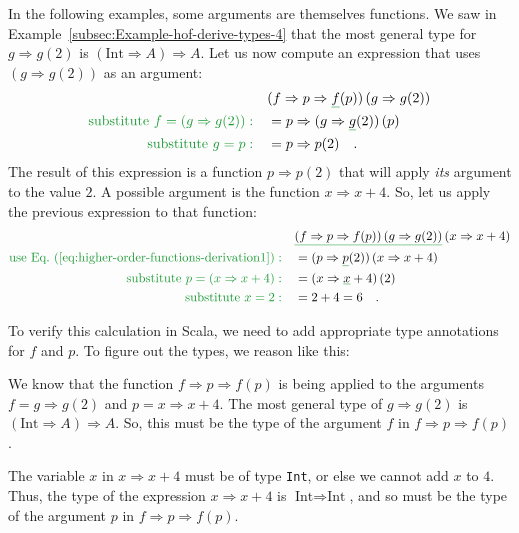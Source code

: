 In the following examples, some arguments are themselves functions.
We saw in Example~\ref{subsec:Example-hof-derive-types-4} that the
most general type for $g\Rightarrow g(2)$ is $\left(\text{Int}\Rightarrow A\right)\Rightarrow A$.
Let us now compute an expression that uses $\left(g\Rightarrow g(2)\right)$
as an argument:
\begin{align}
 & (f\Rightarrow p\Rightarrow\gunderline f(p))\left(g\Rightarrow g(2)\right)\nonumber \\
{\color{greenunder}\text{substitute }f=\left(g\Rightarrow g(2)\right):}\quad & =p\Rightarrow(g\Rightarrow\gunderline g(2))\,(p)\nonumber \\
{\color{greenunder}\text{substitute }g=p:}\quad & =p\Rightarrow p(2)\quad.\label{eq:higher-order-functions-derivation1}
\end{align}
The result of this expression is a function $p\Rightarrow p(2)$ that
will apply \emph{its} argument to the value $2$. A possible argument
is the function $x\Rightarrow x+4$. So, let us apply the previous
expression to that function:
\begin{align*}
 & \gunderline{\left(f\Rightarrow p\Rightarrow f(p)\right)\left(g\Rightarrow g(2)\right)}\left(x\Rightarrow x+4\right)\\
{\color{greenunder}\text{use Eq.~(\ref{eq:higher-order-functions-derivation1})}:}\quad & =(p\Rightarrow\gunderline p(2))\left(x\Rightarrow x+4\right)\\
{\color{greenunder}\text{substitute }p=\left(x\Rightarrow x+4\right):}\quad & =(x\Rightarrow\gunderline x+4)\left(2\right)\\
{\color{greenunder}\text{substitute }x=2:}\quad & =2+4=6\quad.
\end{align*}

To verify this calculation in Scala, we need to add appropriate type
annotations for $f$ and $p$. To figure out the types, we reason
like this:

We know that the function $f\Rightarrow p\Rightarrow f(p)$ is being
applied to the arguments $f=g\Rightarrow g(2)$ and $p=x\Rightarrow x+4$.
The most general type of $g\Rightarrow g(2)$ is $\left(\text{Int}\Rightarrow A\right)\Rightarrow A$.
So, this must be the type of the argument $f$ in $f\Rightarrow p\Rightarrow f(p)$.

The variable $x$ in $x\Rightarrow x+4$ must be of type \lstinline!Int!,
or else we cannot add $x$ to $4$. Thus, the type of the expression
$x\Rightarrow x+4$ is $\text{Int}\Rightarrow\text{Int}$, and so
must be the type of the argument $p$ in $f\Rightarrow p\Rightarrow f(p)$. 

